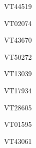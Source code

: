 \documentclass[17pt]{extarticle}
\begin{document}
\vspace*{\fill}\begin{large}
VT44519 \\[0.5em]
\end{large}
\footnotesize
\vspace*{\fill}
\newpage{}
\vspace*{\fill}\begin{large}
VT02074 \\[0.5em]
\end{large}
\footnotesize
\vspace*{\fill}
\newpage{}
\vspace*{\fill}\begin{large}
VT43670 \\[0.5em]
\end{large}
\footnotesize
\vspace*{\fill}
\newpage{}
\vspace*{\fill}\begin{large}
VT50272 \\[0.5em]
\end{large}
\footnotesize
\vspace*{\fill}
\newpage{}
\vspace*{\fill}\begin{large}
VT13039 \\[0.5em]
\end{large}
\footnotesize
\vspace*{\fill}
\newpage{}
\vspace*{\fill}\begin{large}
VT17934 \\[0.5em]
\end{large}
\footnotesize
\vspace*{\fill}
\newpage{}
\vspace*{\fill}\begin{large}
VT28605 \\[0.5em]
\end{large}
\footnotesize
\vspace*{\fill}
\newpage{}
\vspace*{\fill}\begin{large}
VT01595 \\[0.5em]
\end{large}
\footnotesize
\vspace*{\fill}
\newpage{}
\vspace*{\fill}\begin{large}
VT43061 \\[0.5em]
\end{large}
\end{document}
